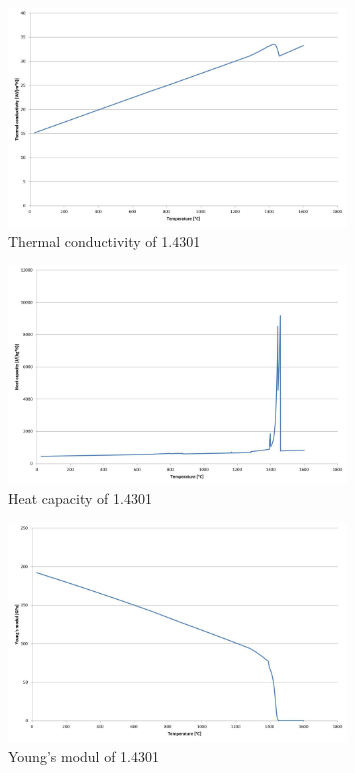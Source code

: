 \begin{figure}[htbp]
 \centering
 \includegraphics[width=0.8\textwidth]{images/thermalconductivity}
 \caption{Thermal conductivity of 1.4301}
 \label{img:thermalconductivity}
\end{figure}

\begin{figure}[htbp]
 \centering
 \includegraphics[width=0.8\textwidth]{images/heatcapacity}
 \caption{Heat capacity of 1.4301}
 \label{img:heatcapacity}
\end{figure}

\begin{figure}[htbp]
 \centering
 \includegraphics[width=0.8\textwidth]{images/youngsmodul}
 \caption{Young's modul of 1.4301}
 \label{img:youngsmodul}
\end{figure}

